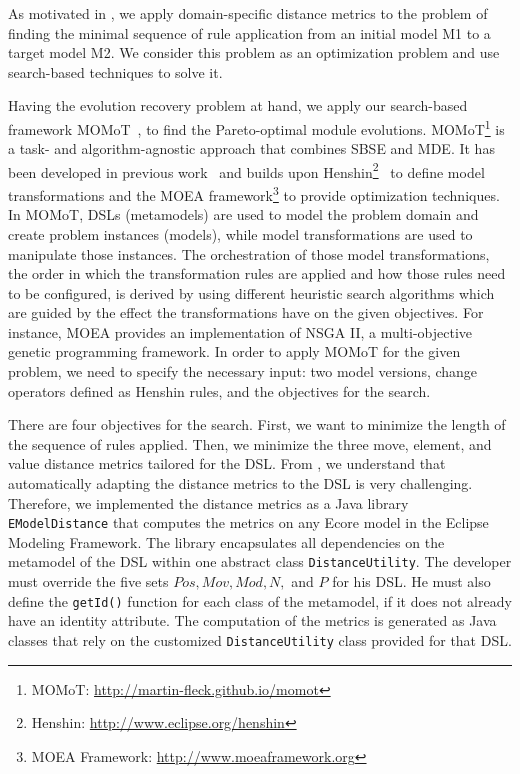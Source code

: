 
As motivated in , we apply domain-specific distance metrics to the problem of finding the minimal sequence of rule application from an initial model M1 to a target model M2.
We consider this problem as an optimization problem and use search-based techniques to solve it.

Having the evolution recovery problem at hand, we apply our search-based framework MOMoT~\cite{Fleck15,FleckTW16}, to find the Pareto-optimal module evolutions.
MOMoT\footnote{
    MOMoT: \url{http://martin-fleck.github.io/momot}
} is a task- and algorithm-agnostic approach that combines SBSE and MDE.
It has been developed in previous work~\cite{Fleck15} and builds upon Henshin\footnote{
    Henshin: \url{http://www.eclipse.org/henshin}
}~\cite{Arendt10} to define model transformations and the MOEA framework\footnote{
    MOEA Framework: \url{http://www.moeaframework.org}
} to provide optimization techniques.
In MOMoT, DSLs (\ie metamodels) are used to model the problem domain and create problem instances (\ie models), while model transformations are used to manipulate those instances.
The orchestration of those model transformations, \ie the order in which the transformation rules are applied and how those rules need to be configured, is derived by using different heuristic search algorithms which are guided by the effect the transformations have on the given objectives.
For instance, MOEA provides an implementation of NSGA II, a multi-objective genetic programming framework.
In order to apply MOMoT for the given problem, we need to specify the necessary input: two model versions, change operators defined as Henshin rules, and the objectives for the search.

There are four objectives for the search.
First, we want to minimize the length of the sequence of rules applied.
Then, we minimize the three move, element, and value distance metrics tailored for the DSL.
From , we understand that automatically adapting the distance metrics to the DSL is very challenging.
Therefore, we implemented the distance metrics as a Java library \texttt{EModelDistance} that computes the metrics on any Ecore model in the Eclipse Modeling Framework.
The library encapsulates all dependencies on the metamodel of the DSL within one abstract class \texttt{DistanceUtility}.
The developer must override the five sets $Pos,Mov,Mod,N,$ and $P$ for his DSL.
He must also define the \texttt{getId()} function for each class of the metamodel, if it does not already have an identity attribute.
The computation of the metrics is generated as Java classes that rely on the customized \texttt{DistanceUtility} class provided for that DSL.